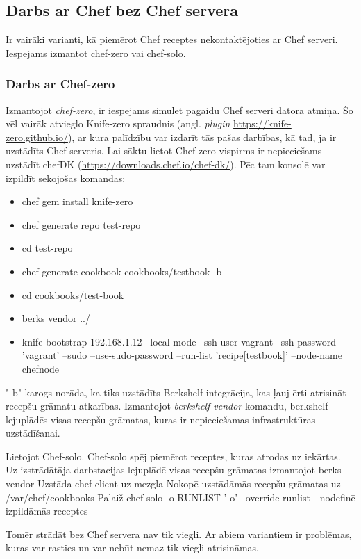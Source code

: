\subsection{Darbs ar Chef bez Chef servera}
Ir vairāki varianti, kā piemērot Chef receptes nekontaktējoties ar Chef serveri. Iespējams izmantot chef-zero vai chef-solo.
\subsubsection{Darbs ar Chef-zero}
Izmantojot \textit{chef-zero}, ir iespējams simulēt pagaidu Chef serveri datora atmiņā. Šo vēl vairāk atvieglo Knife-zero spraudnis (angl. \textit{plugin} \url{https://knife-zero.github.io/}), ar kura palīdzību var izdarīt tās pašas darbības, kā tad, ja ir uzstādīts Chef serveris.
Lai sāktu lietot Chef-zero vispirms ir nepieciešams uzstādīt chefDK (\url{https://downloads.chef.io/chef-dk/}).
Pēc tam konsolē var izpildīt sekojošas komandas:
\begin{itemize}
  \item chef gem install knife-zero
  \item chef generate repo test-repo
  \item cd test-repo
  \item chef generate cookbook cookbooks/testbook -b
  \item cd cookbooks/test-book
  \item berks vendor ../
  \item knife bootstrap 192.168.1.12 --local-mode --ssh-user vagrant --ssh-password 'vagrant' --sudo --use-sudo-password --run-list 'recipe[testbook]' --node-name chefnode
\end{itemize}
"-b"  karogs norāda, ka tiks uzstādīts Berkshelf integrācija, kas ļauj ērti atrisināt recepšu grāmatu atkarības.
Izmantojot \textit{berkshelf vendor} komandu, berkshelf lejuplādēs visas recepšu grāmatas, kuras ir nepieciešamas infrastruktūras uzstādīšanai.

Lietojot Chef-solo.
Chef-solo spēj piemērot receptes, kuras atrodas uz iekārtas.
Uz izstrādātāja darbstacijas lejuplādē visas recepšu grāmatas izmantojot berks vendor
Uzstāda chef-client uz mezgla
Nokopē uzstādāmās recepšu grāmatas uz /var/chef/cookbooks
Palaiž chef-solo -o RUNLIST
'-o' --override-runlist	- nodefinē izpildāmās receptes

Tomēr strādāt bez Chef servera nav tik viegli. Ar abiem variantiem ir problēmas, kuras var rasties un var nebūt nemaz tik viegli atrisināmas.

